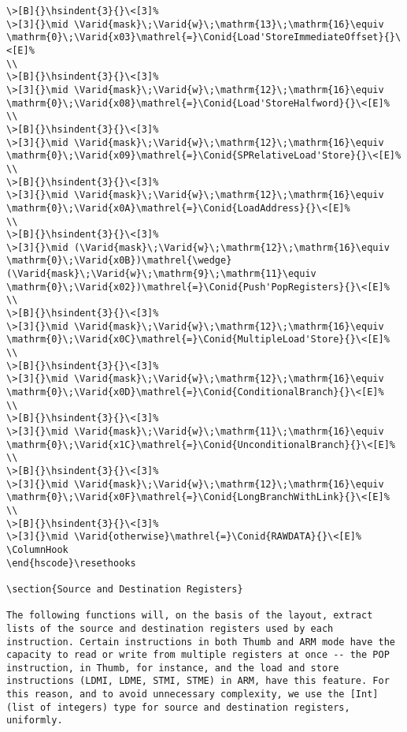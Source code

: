 \documentclass{article}
\newcommand{\Conid}[1]{\mathit{#1}}
\newcommand{\Varid}[1]{\mathit{#1}}
\def\resethooks{%
  \global\let\SaveRestoreHook\empty
  \global\let\ColumnHook\empty}
\newcommand{\hsindent}[1]{\quad}%
\begin{document}
\begin{Verbatim}[fontsize=\scriptsize]
\>[B]{}\hsindent{3}{}\<[3]%
\>[3]{}\mid \Varid{mask}\;\Varid{w}\;\mathrm{13}\;\mathrm{16}\equiv \mathrm{0}\;\Varid{x03}\mathrel{=}\Conid{Load'StoreImmediateOffset}{}\<[E]%
\\
\>[B]{}\hsindent{3}{}\<[3]%
\>[3]{}\mid \Varid{mask}\;\Varid{w}\;\mathrm{12}\;\mathrm{16}\equiv \mathrm{0}\;\Varid{x08}\mathrel{=}\Conid{Load'StoreHalfword}{}\<[E]%
\\
\>[B]{}\hsindent{3}{}\<[3]%
\>[3]{}\mid \Varid{mask}\;\Varid{w}\;\mathrm{12}\;\mathrm{16}\equiv \mathrm{0}\;\Varid{x09}\mathrel{=}\Conid{SPRelativeLoad'Store}{}\<[E]%
\\
\>[B]{}\hsindent{3}{}\<[3]%
\>[3]{}\mid \Varid{mask}\;\Varid{w}\;\mathrm{12}\;\mathrm{16}\equiv \mathrm{0}\;\Varid{x0A}\mathrel{=}\Conid{LoadAddress}{}\<[E]%
\\
\>[B]{}\hsindent{3}{}\<[3]%
\>[3]{}\mid (\Varid{mask}\;\Varid{w}\;\mathrm{12}\;\mathrm{16}\equiv \mathrm{0}\;\Varid{x0B})\mathrel{\wedge}(\Varid{mask}\;\Varid{w}\;\mathrm{9}\;\mathrm{11}\equiv \mathrm{0}\;\Varid{x02})\mathrel{=}\Conid{Push'PopRegisters}{}\<[E]%
\\
\>[B]{}\hsindent{3}{}\<[3]%
\>[3]{}\mid \Varid{mask}\;\Varid{w}\;\mathrm{12}\;\mathrm{16}\equiv \mathrm{0}\;\Varid{x0C}\mathrel{=}\Conid{MultipleLoad'Store}{}\<[E]%
\\
\>[B]{}\hsindent{3}{}\<[3]%
\>[3]{}\mid \Varid{mask}\;\Varid{w}\;\mathrm{12}\;\mathrm{16}\equiv \mathrm{0}\;\Varid{x0D}\mathrel{=}\Conid{ConditionalBranch}{}\<[E]%
\\
\>[B]{}\hsindent{3}{}\<[3]%
\>[3]{}\mid \Varid{mask}\;\Varid{w}\;\mathrm{11}\;\mathrm{16}\equiv \mathrm{0}\;\Varid{x1C}\mathrel{=}\Conid{UnconditionalBranch}{}\<[E]%
\\
\>[B]{}\hsindent{3}{}\<[3]%
\>[3]{}\mid \Varid{mask}\;\Varid{w}\;\mathrm{12}\;\mathrm{16}\equiv \mathrm{0}\;\Varid{x0F}\mathrel{=}\Conid{LongBranchWithLink}{}\<[E]%
\\
\>[B]{}\hsindent{3}{}\<[3]%
\>[3]{}\mid \Varid{otherwise}\mathrel{=}\Conid{RAWDATA}{}\<[E]%
\ColumnHook
\end{hscode}\resethooks

\section{Source and Destination Registers}

The following functions will, on the basis of the layout, extract lists of the source and destination registers used by each instruction. Certain instructions in both Thumb and ARM mode have the capacity to read or write from multiple registers at once -- the POP instruction, in Thumb, for instance, and the load and store instructions (LDMI, LDME, STMI, STME) in ARM, have this feature. For this reason, and to avoid unnecessary complexity, we use the [Int] (list of integers) type for source and destination registers, uniformly.



\end{Verbatim}
\end{document}
